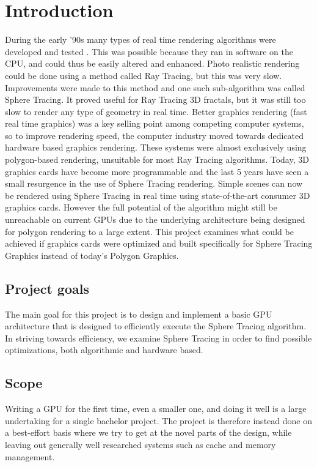 \chapter{Introduction} 	
	During the early '90s many types of real time rendering algorithms were 
	developed and tested \cite{TODO}. This was possible because they ran in 
	software on the CPU, and could thus be easily altered and enhanced. 
	Photo realistic rendering could be done using a method called Ray Tracing, 
	but this was very slow\cite{TODO}. Improvements were made to this method and 
	one such sub-algorithm was called Sphere Tracing. It proved useful for Ray 
	Tracing 3D fractals\cite{TODO}, but it was still too slow to render any type 
	of geometry in real time\cite{TODO}. Better graphics rendering (fast real 
	time graphics) was a key selling point among competing computer systems, so 
	to improve rendering speed, the computer industry moved towards dedicated 
	hardware based 	graphics rendering\cite{TODO}. These systems were almost 
	exclusively using polygon-based rendering, unsuitable for most Ray Tracing 
	algorithms. Today, 	3D graphics cards have become more programmable and the 
	last 5 years have seen a small resurgence in the use of Sphere Tracing 
	rendering\cite{TODO}. Simple scenes can now be rendered using Sphere Tracing 
	in real time using state-of-the-art consumer 3D graphics cards. However the 
	full potential of the algorithm might still be unreachable on current GPUs 
	due to the underlying architecture being designed for polygon rendering to a 
	large extent\cite{TODO}. This project examines what could be achieved if 
	graphics cards were optimized and built specifically for Sphere Tracing 
	Graphics instead of today’s Polygon Graphics.		 
	
	\section{Project goals}
	
		The main goal for this project is to design and implement a basic GPU 
		architecture that is designed to efficiently execute the Sphere Tracing 
		algorithm. In striving towards efficiency, we examine Sphere Tracing in 
		order to find possible optimizations, both algorithmic and hardware 
		based.
		
	\section{Scope}

		Writing a GPU for the first time, even a smaller one, and doing it well is
		a large undertaking for a single bachelor project. The project is therefore
		instead done on a best-effort basis where we try to get at the novel parts
		of the design, while leaving out generally well researched systems such as
		cache and memory management. 
